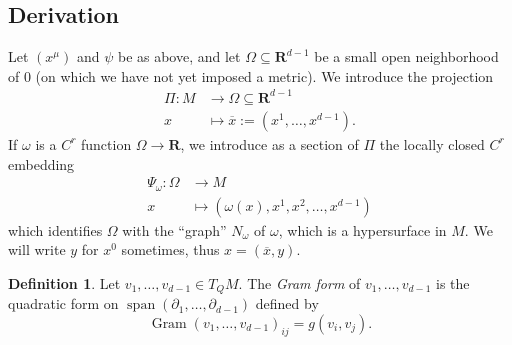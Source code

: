 \documentclass[reqno,12pt,letterpaper]{amsart}
\newcommand{\RR}{\mathbf{R}}
\DeclareMathOperator{\Gram}{Gram}
\DeclareMathOperator{\spn}{span}
\newcommand{\dfn}[1]{\emph{#1}\index{#1}}
\theoremstyle{definition}
\newtheorem{definition}[theorem]{Definition}
\numberwithin{equation}{section}
\begin{document}
\subsection{Derivation}
Let $(x^\mu)$ and $\psi$ be as above, and let $\Omega \subseteq \RR^{d - 1}$ be a small open neighborhood of $0$ (on which we have not yet imposed a metric).
We introduce the projection
\begin{align*}
    \Pi: M &\to \Omega \subseteq \RR^{d - 1}\\
    x &\mapsto \overline x := (x^1, \dots, x^{d - 1}).
\end{align*}
If $\omega$ is a $C^r$ function $\Omega \to \RR$, we introduce as a section of $\Pi$ the locally closed $C^r$ embedding
\begin{align*}
    \Psi_\omega: \Omega &\to M \\
    x &\mapsto (\omega(x), x^1, x^2, \dots, x^{d - 1})
\end{align*}
which identifies $\Omega$ with the ``graph'' $N_\omega$ of $\omega$, which is a hypersurface in $M$.
We will write $y$ for $x^0$ sometimes, thus $x = (\overline x, y)$.

\begin{definition}
Let $v_1, \dots, v_{d - 1} \in T_QM$.
The \dfn{Gram form} of $v_1, \dots, v_{d - 1}$ is the quadratic form on $\spn(\partial_1, \dots, \partial_{d - 1})$ defined by
$$\Gram(v_1, \dots, v_{d - 1})_{ij} = g(v_i, v_j).$$
\end{definition}
\end{document}
